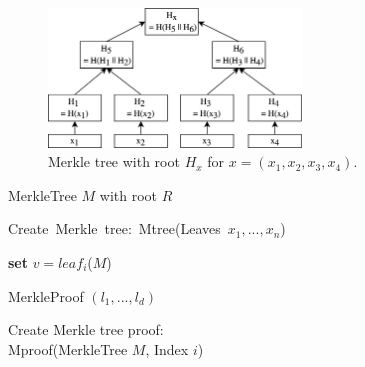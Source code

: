 \documentclass{cacthesis}
\begin{document}
            \begin{figure}
            \begin{center}
              \includegraphics[width=0.6\textwidth]{images/merkle_tree_figure.png}
              \caption{Merkle tree with root $H_x$ for $x = (x_1, x_2, x_3, x_4)$.}
              \label{fig:merkleTreePrelims}
            \end{center}
            \end{figure}
        
        \begin{center}
        \begin{minipage}[t]{4in}
            \begin{algorithm}[H]
                \Return MerkleTree $M$ with root $R$\;
                \caption{\mbox{Create Merkle tree: \textsf{Mtree}(Leaves \textit{$x_1, ...,x_n$})}}
                \label{algo:Mtree}
            \end{algorithm}
        \end{minipage}
        \end{center}   
        
        \begin{center}
        \begin{minipage}[t]{4in}    
        \begin{algorithm}[H]
                \textbf{set} $v = leaf_i$($M$) \;
                 
                \Return MerkleProof $(l_1, ..., l_d)$\;
                
                \caption{Create Merkle tree proof: \\ \textsf{Mproof}(MerkleTree $M$, Index $i$)}
                \label{algo:Mproof}
            \end{algorithm}
        \end{minipage}
        \end{center}
        
\end{document}
